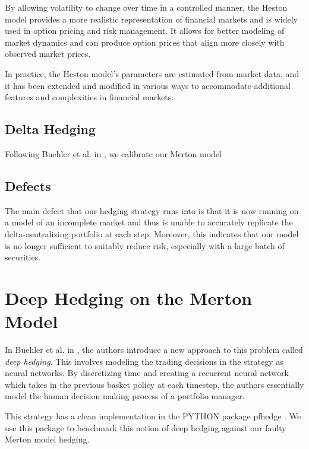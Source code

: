 \documentclass{article}
\begin{document}
By allowing volatility to change over time in a controlled manner, the Heston model provides a more realistic representation of financial markets and is widely used in option pricing and risk management. It allows for better modeling of market dynamics and can produce option prices that align more closely with observed market prices.

In practice, the Heston model's parameters are estimated from market data, and it has been extended and modified in various ways to accommodate additional features and complexities in financial markets.



\subsection{Delta Hedging}

Following Buehler et al. in \cite{deephedge}, we calibrate our Merton model 

\subsection{Defects}
The main defect that our hedging strategy runs into is that it is now running on a model of an incomplete market and thus is unable to accurately replicate the delta-neutralizing portfolio at each step. Moreover, this indicates that our model is no longer sufficient to suitably reduce risk, especially with a large batch of securities.

\section{Deep Hedging on the Merton Model}


In Buehler et al. in \cite{deephedge}, the authors introduce a new approach to this problem called \textit{deep hedging}. This involves modeling the trading decisions in the strategy as neural networks. By discretizing time and creating a recurrent neural network which takes in the previous basket policy at each timestep, the authors essentially model the human decision making process of a portfolio manager.

This strategy has a clean implementation in the PYTHON package pfhedge \cite{pfhedge}. We use this package to benchmark this notion of deep hedging against our faulty Merton model hedging.
	
\end{document}
